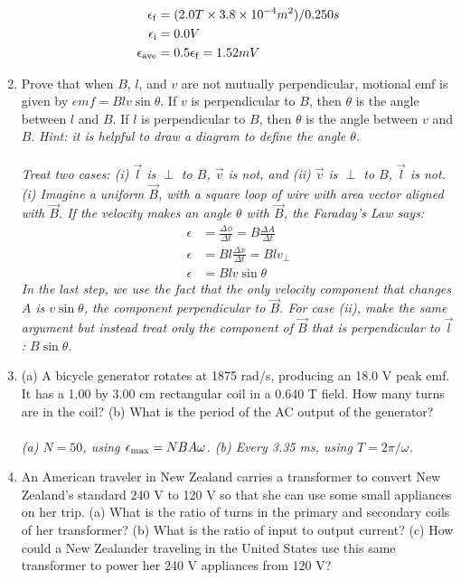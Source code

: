 \documentclass[12pt,twocolumn]{article}
\begin{document}
\begin{enumerate}
\begin{align}
\epsilon_{\rm f} &= (2.0 T \times 3.8 \times 10^{-4} m^2)/0.250 s \\
\epsilon_{\rm i} &= 0.0 V \\
\epsilon_{\rm ave} &= 0.5\epsilon_{\rm f} = 1.52 mV
\end{align}
\item Prove that when $B$, $l$, and $v$ are not mutually perpendicular, motional emf is given by $emf = Blv\sin\theta$. If $v$ is perpendicular to $B$, then $\theta$ is the angle between $l$ and $B$. If $l$ is perpendicular to $B$, then $\theta$ is the angle between $v$ and $B$. \textit{Hint: it is helpful to draw a diagram to define the angle $\theta$.} \\ \\
\textit{Treat two cases: (i) $\vec{l}$ is $\perp$ to ${B}$, $\vec{v}$ is not, and (ii) $\vec{v}$ is $\perp$ to ${B}$, $\vec{l}$ is not.  (i) Imagine a uniform $\vec{B}$, with a square loop of wire with area vector aligned with $\vec{B}$.  If the velocity makes an angle $\theta$ with $\vec{B}$, the Faraday's Law says:
\begin{align}
\epsilon &= \frac{\Delta \phi}{\Delta t} = B \frac{\Delta A}{\Delta t} \\
\epsilon &= B l \frac{\Delta x}{\Delta t} = B l v_{\perp} \\
\epsilon &= B l v \sin\theta
\end{align}
In the last step, we use the fact that the only velocity component that changes $A$ is $v\sin\theta$, the component perpendicular to $\vec{B}$.  For case (ii), make the same argument but instead treat only the component of $\vec{B}$ that is perpendicular to $\vec{l}$: $B\sin\theta$.}
\item (a) A bicycle generator rotates at 1875 rad/s, producing an 18.0 V peak emf. It has a 1.00 by 3.00 cm rectangular coil in a 0.640 T field. How many turns are in the coil? (b) What is the period of the AC output of the generator?  \\ \\
\textit{(a) $N = 50$, using $\epsilon_{\rm max} = N B A \omega$. (b) Every 3.35 ms, using $T = 2\pi/\omega$.}
\item An American traveler in New Zealand carries a transformer to convert New Zealand's standard 240 V to 120 V so that she can use some small appliances on her trip. (a) What is the ratio of turns in the primary and secondary coils of her transformer? (b) What is the ratio of input to output current? (c) How could a New Zealander traveling in the United States use this same transformer to power her 240 V appliances from 120 V? \\ \\

\end{enumerate}
\end{document}
